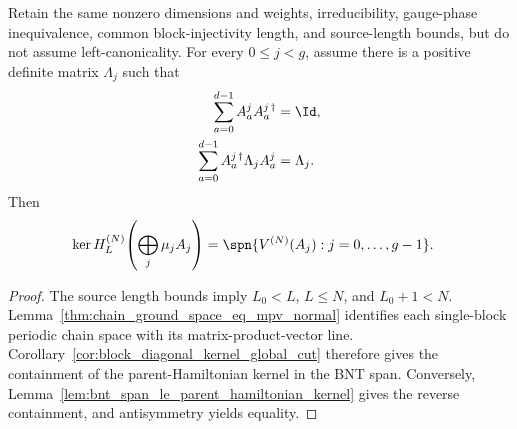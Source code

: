 \begin{lemma}
    \label{thm:gs_eq_bnt_span_source_normalization}
    \leanok
    Retain the same nonzero dimensions and weights, irreducibility,
    gauge-phase inequivalence, common block-injectivity length,
    and source-length bounds, but do not assume left-canonicality. For every
    $0\le j<g$, assume there is a positive definite matrix $\Lambda_j$ such
    that
    \begin{align}
        \sum_{a=0}^{d-1} A^j_a A^{j\,\dagger}_a          & =\Id,
        \notag                                                         \\
        \sum_{a=0}^{d-1} A^{j\,\dagger}_a\Lambda_j A^j_a & =\Lambda_j.
        \notag
    \end{align}
    Then
    \begin{align}
        \ker H_L^{(N)}\!\left(\bigoplus_j \mu_j A_j\right)
         & =
        \spn\{V^{(N)}(A_j):j=0,\ldots,g-1\}.
        \notag
    \end{align}
\end{lemma}

\begin{proof}
    \leanok
    The source length bounds imply $L_0<L$, $L\le N$, and $L_0+1<N$.
    Lemma~\ref{thm:chain_ground_space_eq_mpv_normal} identifies each
    single-block periodic chain space with its matrix-product-vector line.
    Corollary~\ref{cor:block_diagonal_kernel_global_cut} therefore gives the
    containment of the parent-Hamiltonian kernel in the BNT span. Conversely,
    Lemma~\ref{lem:bnt_span_le_parent_hamiltonian_kernel} gives the reverse
    containment, and antisymmetry yields equality.
\end{proof}
